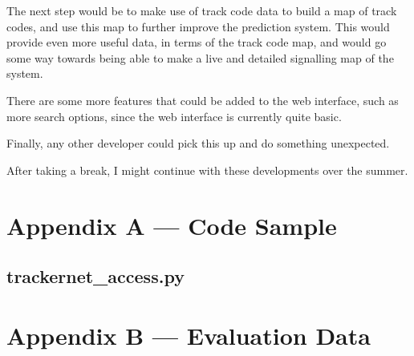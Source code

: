 \documentclass[a4paper,12pt,twoside]{report}
\begin{document}
The next step would be to make use of track code data to build a map of track
codes, and use this map to further improve the prediction system. This would
provide even more useful data, in terms of the track code map, and would go
some way towards being able to make a live and detailed signalling map of the
system.

There are some more features that could be added to the web interface, such as
more search options, since the web interface is currently quite basic.

Finally, any other developer could pick this up and do something unexpected.

After taking a break, I might continue with these developments over the summer.

\pagebreak





\chapter*{Appendix A --- Code Sample}

\section*{trackernet\_access.py}



\chapter*{Appendix B --- Evaluation Data}


\end{document}

